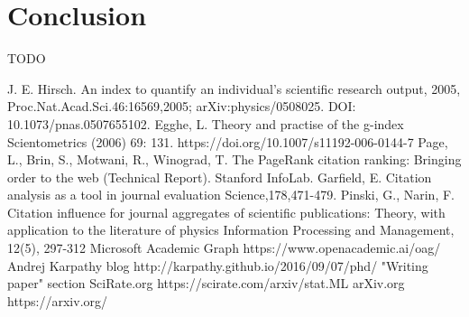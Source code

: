 \documentclass[a4paper, 11pt]{article}
\begin{document}
\section{Conclusion}
TODO
\begin{thebibliography}{9}
J. E. Hirsch.
\newblock An index to quantify an individual's scientific research output, 2005,
\newblock Proc.Nat.Acad.Sci.46:16569,2005;
\newblock arXiv:physics/0508025.
\newblock DOI: 10.1073/pnas.0507655102.
Egghe, L.
\newblock  Theory and practise of the g-index
\newblock Scientometrics (2006) 69: 131.
\newblock https://doi.org/10.1007/s11192-006-0144-7
Page, L., Brin, S., Motwani, R., Winograd, T. 
\newblock  The PageRank citation ranking: Bringing order to the web  
\newblock  (Technical Report). Stanford InfoLab.
Garfield, E.
\newblock  Citation analysis as a tool in journal evaluation
\newblock Science,178,471-479.
Pinski, G.,  Narin, F. 
\newblock Citation influence for journal aggregates of scientific publications: Theory, with application to the literature of physics
\newblock  Information Processing and Management, 12(5), 297-312
Microsoft Academic Graph 
\newblock https://www.openacademic.ai/oag/
Andrej Karpathy blog
\newblock http://karpathy.github.io/2016/09/07/phd/
\newblock "Writing paper" section
SciRate.org
\newblock  https://scirate.com/arxiv/stat.ML
arXiv.org
\newblock  https://arxiv.org/

\end{thebibliography}

\listoffigures
\end{document}
